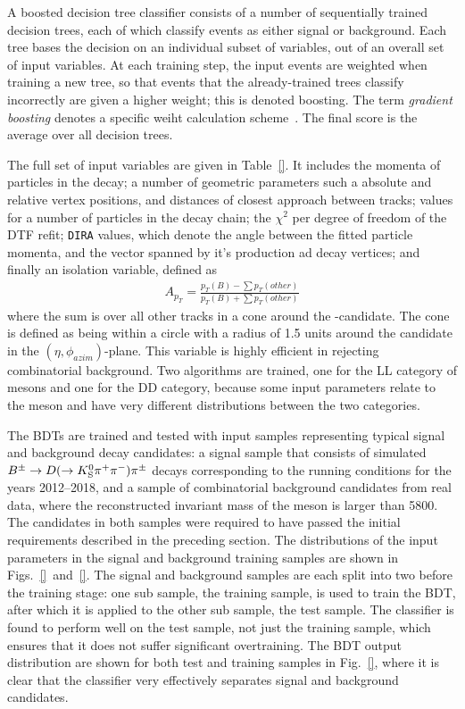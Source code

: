 A boosted decision tree classifier consists of a number of sequentially trained decision trees, each of which classify events as either signal or background. Each tree bases the decision on an individual subset of variables, out of an overall set of input variables. At each training step, the input events are weighted when training a new tree, so that events that the already-trained trees classify incorrectly are given a higher weight; this is denoted boosting. The term \emph{gradient boosting} denotes a specific weiht calculation scheme~\cite{}. The final score is the average over all decision trees.

The full set of input variables are given in Table~\ref{}. It includes the momenta of particles in the decay; a number of geometric parameters such a absolute and relative vertex positions, and distances of closest approach between tracks; \ipchisq values for a number of particles in the decay chain; the $\chi^2$ per degree of freedom of the DTF refit; \texttt{DIRA} values, which denote the angle between the fitted particle momenta, and the vector spanned by it's production ad decay vertices; and finally an isolation variable, defined as
\begin{align}
    A_{p_T} = \frac{p_T(B)-\sum p_T(other)}{p_T(B)+\sum p_T(other)}
\end{align}{}
where the sum is over all other tracks in a cone around the \B-candidate. The cone is defined as being within a circle with a radius of 1.5 units around the \B candidate in the $(\eta, \phi_{azim})$-plane. This variable is highly efficient in rejecting combinatorial background.
Two algorithms are trained, one for the LL category of \KS mesons and one for the DD category, because some input parameters relate to the \KS meson and have very different distributions between the two categories. 

The BDTs are trained and tested with input samples representing typical signal and background decay candidates: a signal sample that consists of simulated ${{B}^\pm}\rightarrow{\ensuremath{D}}(\rightarrow{\ensuremath{{K}^0_{\mathrm{S}}}}{\ensuremath{{\pi}^+}}{\ensuremath{{\pi}^-}}){{\pi}^\pm}$ decays corresponding to the \lhcb running conditions for the years 2012--2018, and a sample of combinatorial background candidates from real data, where the reconstructed invariant mass of the \B meson is larger than 5800\mevcc. The candidates in both samples were required to have passed the initial requirements described in the preceding section. The distributions of the input parameters in the signal and background training samples are shown in Figs.~\ref{}~and~\ref{}. The signal and background samples are each split into two before the training stage: one sub sample, the training sample, is used to train the BDT, after which it is applied to the other sub sample, the test sample. The classifier is found to perform well on the test sample, not just the training sample, which ensures that it does not suffer significant overtraining. The BDT output distribution are shown for both test and training samples in Fig.~\ref{}, where it is clear that the classifier very effectively separates signal and background candidates.

